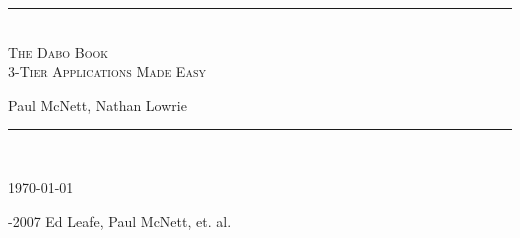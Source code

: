 \documentclass[letterpaper,10pt]{RevisedBook}
\newcommand{\titlerule}{\rule{\linewidth}{1.5mm}}
\renewcommand{\title}{The Dabo Book}				%
\newcommand{\subtitle}{3-Tier Applications Made Easy}	%
\renewcommand{\author}{Paul McNett, Nathan Lowrie}					%
\newcommand{\copyrightHolder}{Ed Leafe, Paul McNett, et. al.}	%
\begin{document}
\frontmatter									%

\begin{titlepage}
    \thispagestyle{empty}
    \begin{center}
    \end{center}
    \begin{center}
        \titlerule\\[3mm]
        \Huge \textsc{\title\\\subtitle}\\[5mm]		%
        \begin{center}
		\huge \author\\[3.5mm]						%
    	\end{center}
       	\titlerule\\
    \end{center}
    \scriptsize \today
    \begin{center}
        -2007 \copyrightHolder			%
    \end{center}
\end{titlepage}

\pagestyle{fancy}                         %
\end{document}
